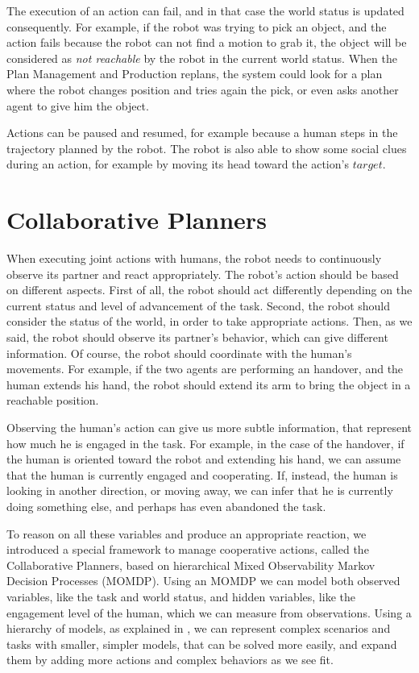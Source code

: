 The execution of an action can fail, and in that case the world status is updated consequently. For example, if the robot was trying to pick an object, and the action fails because the robot can not find a motion to grab it, the object will be considered as \textit{not reachable} by the robot in the current world status. When the Plan Management and Production replans, the system could look for a plan where the robot changes position and tries again the pick, or even asks another agent to give him the object.

Actions can be paused and resumed, for example because a human steps in the trajectory planned by the robot. The robot is also able to show some social clues during an action, for example by moving its head toward the action's $target$. 

\section{Collaborative Planners} 
\label{sec:plan_execution-collaborative_planners}
When executing joint actions with humans, the robot needs to continuously observe its partner and react appropriately. The robot's action should be based on different aspects. First of all, the robot should act differently depending on the current status and level of advancement of the task. Second, the robot should consider the status of the world, in order to take appropriate actions. Then, as we said, the robot should observe its partner's behavior, which can give different information. Of course, the robot should coordinate with the human's movements. For example, if the two agents are performing an handover, and the human extends his hand, the robot should extend its arm to bring the object in a reachable position.

Observing the human's action can give us more subtle information, that represent how much he is engaged in the task. For example, in the case of the handover, if the human is oriented toward the robot and extending his hand, we can assume that the human is currently engaged and cooperating. If, instead, the human is looking in another direction, or moving away, we can infer that he is currently doing something else, and perhaps has even abandoned the task.

To reason on all these variables and produce an appropriate reaction, we introduced a special framework to manage cooperative actions, called the Collaborative Planners, based on hierarchical Mixed Observability Markov Decision Processes (MOMDP). Using an MOMDP we can model both observed variables, like the task and world status, and hidden variables, like the engagement level of the human, which we can measure from observations. Using a hierarchy of models, as explained in \cite{pineau2001hierarchical}, we can represent complex scenarios and tasks with smaller, simpler models, that can be solved more easily, and expand them by adding more actions and complex behaviors as we see fit.

